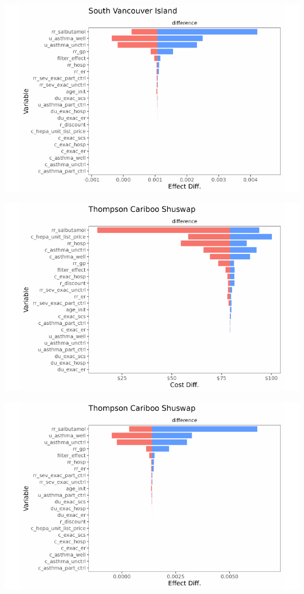 \documentclass[
  number]{elsarticle}
\begin{document}
\includegraphics{index_files/figure-pdf/unnamed-chunk-9-28.pdf}

\includegraphics{index_files/figure-pdf/unnamed-chunk-9-29.pdf}

\includegraphics{index_files/figure-pdf/unnamed-chunk-9-30.pdf}
\end{document}

